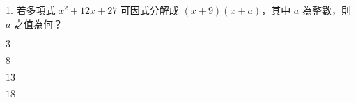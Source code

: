\documentclass[12pt]{article}
\begin{document}
\begin{problem}
  \item[1.] 若多項式 $x^2 + 12x + 27$ 可因式分解成 $(x + 9)(x + a)$，其中 $a$ 為整數，則 $a$ 之值為何？
  \begin{choices}
    \item $3$
    \item $8$
    \item $13$
    \item $18$
  \end{choices}
\end{problem}
\end{document}
